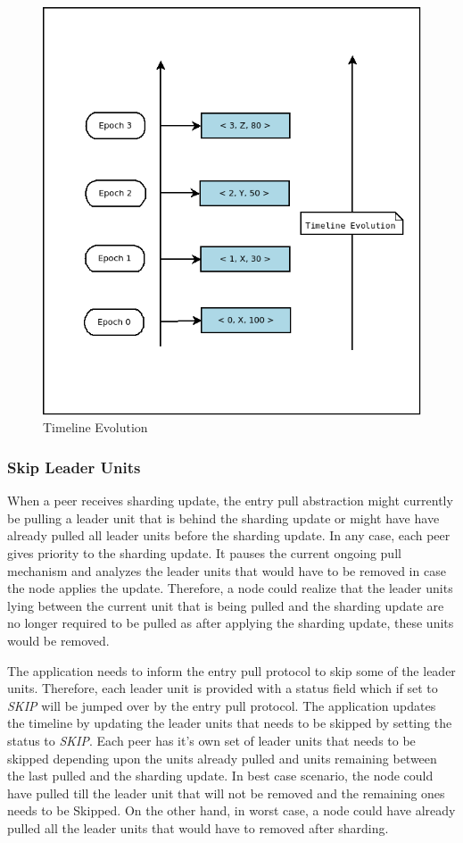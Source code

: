 \documentclass[12pt,a4paper,twoside,openright]{book}
\begin{document}
\begin{figure}[H]
	\includegraphics[scale=0.5]{timeline_new}
	\centering
	\caption{Timeline Evolution}
	\label{fig:timeline}
\end{figure}



\subsubsection{Skip Leader Units}

When a peer receives sharding update, the entry pull abstraction might currently be pulling a leader unit that is behind the sharding update or might have have already pulled all leader units before the sharding update. In any case, each peer gives priority to the sharding update. It pauses the current ongoing pull mechanism and analyzes the leader units that would have to be removed in case the node applies the update. Therefore, a node could realize that the leader units lying between the current unit that is being pulled and the sharding update are no longer required to be pulled as after applying the sharding update, these units would be removed.
\par The application needs to inform the entry pull protocol to skip some of the leader units. Therefore, each leader unit is provided with a status field which if set to \textit{SKIP} will be jumped over by the entry pull protocol. The application updates the timeline by updating the leader units that needs to be skipped by setting the status to \textit{SKIP}. Each peer has it's own set of leader units that needs to be skipped depending upon the units already pulled and units remaining between the last pulled and the sharding update. In best case scenario, the node could have pulled till the leader unit that will not be removed and the remaining ones needs to be Skipped. On the other hand, in worst case, a node could have already pulled all the leader units that would have to removed after sharding.
\end{document}
